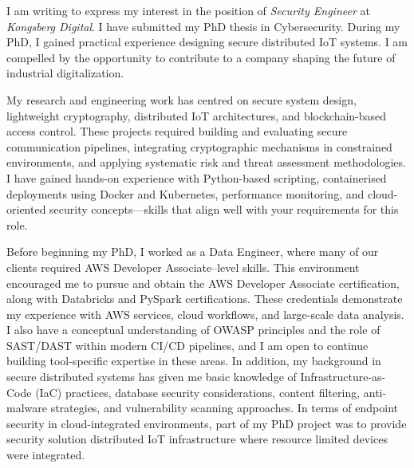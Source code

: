 

I am writing to express my interest in the position of \textit{Security Engineer} at \textit{Kongsberg Digital}. I have submitted my PhD thesis in Cybersecurity. During my PhD, I gained practical experience designing secure distributed IoT systems. I am compelled by the opportunity to contribute to a company shaping the future of industrial digitalization. 


My research and engineering work has centred on secure system design, lightweight cryptography, distributed IoT architectures, and blockchain-based access control. These projects required building and evaluating secure communication pipelines, integrating cryptographic mechanisms in constrained environments, and applying systematic risk and threat assessment methodologies. I have gained hands-on experience with Python-based scripting, containerised deployments using Docker and Kubernetes, performance monitoring, and cloud-oriented security concepts—skills that align well with your requirements for this role.

Before beginning my PhD, I worked as a Data Engineer, where many of our clients required AWS Developer Associate–level skills. This environment encouraged me to pursue and obtain the AWS Developer Associate certification, along with Databricks and PySpark certifications. These credentials demonstrate my experience with AWS services, cloud workflows, and large-scale data analysis. I also have a conceptual understanding of OWASP principles and the role of SAST/DAST within modern CI/CD pipelines, and I am open to continue building tool-specific expertise in these areas. In addition, my background in secure distributed systems has given me basic knowledge of Infrastructure-as-Code (IaC) practices, database security considerations, content filtering, anti-malware strategies, and vulnerability scanning approaches. In terms of endpoint security in cloud-integrated environments, part of my PhD project was to provide security solution distributed IoT infrastructure where resource limited devices were integrated. 

